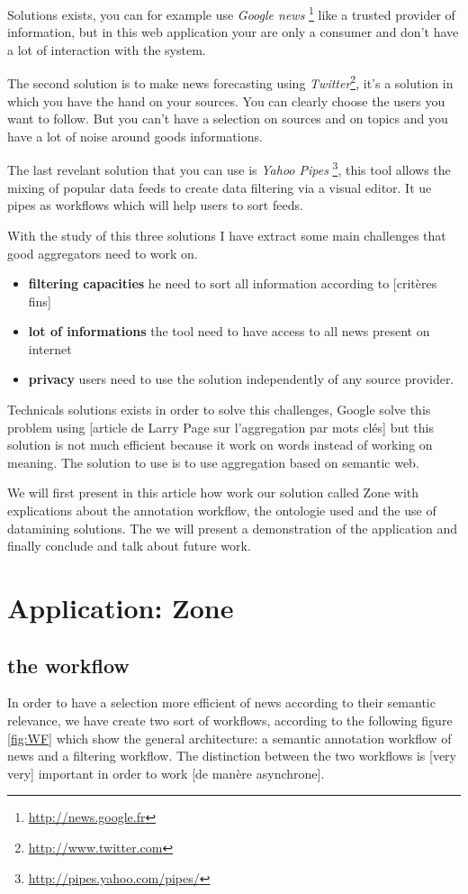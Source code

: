 \documentclass{llncs}
\begin{document}
Solutions exists, you can for example use \textsl{Google news} \footnote{\url{http://news.google.fr}} like a trusted provider of information, but in this web application your are only a consumer and don't have a lot of interaction with the system. 

The second solution is to make news forecasting using \textsl{Twitter}\footnote{\url{http://www.twitter.com}}, it's a  solution in which you have the hand on your sources. You can clearly choose the users you want to follow. But you can't have a selection on sources and on topics and you have a lot of noise around goods informations.

The last revelant solution that you can use is \textsl{Yahoo Pipes} \footnote{\url{http://pipes.yahoo.com/pipes/}}, this tool allows the mixing of popular data feeds to create data filtering via a visual editor. It ue pipes as workflows which will help users to sort feeds.

With the study of this three solutions I have extract some main challenges that good aggregators need to work on.
\begin{itemize}
  \item \textbf{filtering capacities} he need to sort all information according to [critères fins]
  \item \textbf{lot of informations} the tool need to have access to all news present on internet 
  \item \textbf{privacy} users need to use the solution independently of any source provider.
\end{itemize}

Technicals solutions exists in order to solve this challenges, Google solve this problem using [article de Larry Page sur l'aggregation par mots clés] but this solution is not much efficient because it work on words instead of working on meaning. The solution to use is to use aggregation based on semantic web. 

We will first present in this article how work our solution called Zone with explications about the annotation workflow, the ontologie used and the use of datamining solutions. The we will present a demonstration of the application and finally conclude and talk about future work.

%
\section{Application: Zone}


\subsection{the workflow}
%
In order to have a selection more efficient of news according to their semantic relevance, we have create two sort of workflows, according to the following figure \ref{fig:WF} which show the general architecture: a semantic annotation workflow of news and a filtering workflow. The distinction between the two workflows is [very very] important in order to work [de manère asynchrone].
\end{document}
